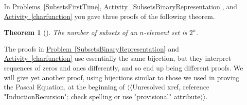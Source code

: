 \documentclass[10pt,]{book}
\theoremstyle{plain}
\newtheorem{theorem}{Theorem}[section]
\theoremstyle{definition}
\numberwithin{equation}{chapter}
\begin{document}
In \hyperref[SubsetsFirstTime]{Problems~\ref{SubsetsFirstTime}}, \hyperref[SubsetsBinaryRepresentation]{Activity~\ref{SubsetsBinaryRepresentation}}, and \hyperref[charfunction]{Activity~\ref{charfunction}} you gave three proofs of the following theorem.%
\begin{theorem}[{}]\label{theorem-1}
The number of subsets of an \(n\)-element set is \(2^n\).%
\end{theorem}
The proofs in \hyperref[SubsetsBinaryRepresentation]{Problem~\ref{SubsetsBinaryRepresentation}} and \hyperref[charfunction]{Activity~\ref{charfunction}} use essentially the same bijection, but they interpret sequences of zeros and ones differently, and so end up being different proofs. We will give yet another proof, using bijections similar to those we used in proving the Pascal Equation, at the beginning of {$\langle\langle$Unresolved xref, reference "InductionRecursion"; check spelling or use "provisional" attribute$\rangle\rangle$}.%
\typeout{************************************************}
\typeout{************************************************}
\end{document}
